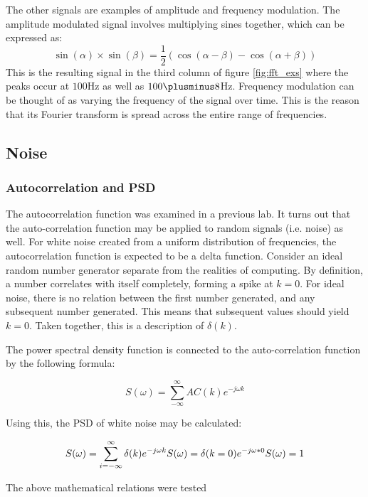 \documentclass[twocolumn]{article}
\begin{document}
The other signals are examples of amplitude and frequency modulation. The
amplitude modulated signal involves multiplying sines together, which can be
expressed as:
\begin{equation}
  \sin(\alpha) \times \sin(\beta) = \frac{1}{2} \left(
    \cos(\alpha - \beta) - \cos(\alpha + \beta)
  \right)
\end{equation}
This is the resulting signal in the third column of figure \ref{fig:fft_exs}
where the peaks occur at $100$Hz as well as $100 \plusminus 8$Hz. Frequency
modulation can be thought of as varying the frequency of the signal over time.
This is the reason that its Fourier transform is spread across the entire range
of frequencies.


\subsection{Noise}
\subsubsection{Autocorrelation and PSD}
The autocorrelation function was examined in a previous lab. It turns out that the auto-correlation function may be applied to random signals (i.e. noise) as well. For white noise created from a uniform distribution of frequencies, the autocorrelation function is expected to be a delta function. Consider an ideal random number generator separate from the realities of computing. By definition, a number correlates with itself completely, forming a spike at $k=0$. For ideal noise, there is no relation between the first number generated, and any subsequent number generated. This means that subsequent values should yield $k=0$. Taken together, this is a description of $\delta(k)$.

The power spectral density function is connected to the auto-correlation function by the following formula:

\[ S(\omega) = \sum_{-\infty}^{\infty} AC(k)e^{-j\omega k} \]

Using this, the PSD of white noise may be calculated:

\[ S(\omega) =  \sum_{i=-\infty}^{\infty} \delta (k) e^{-j\omega k}\\
S(\omega) = \delta(k=0) e^{-j\omega * 0} \\
S(\omega) = 1
\] 

The above mathematical relations were tested 

\end{document}
